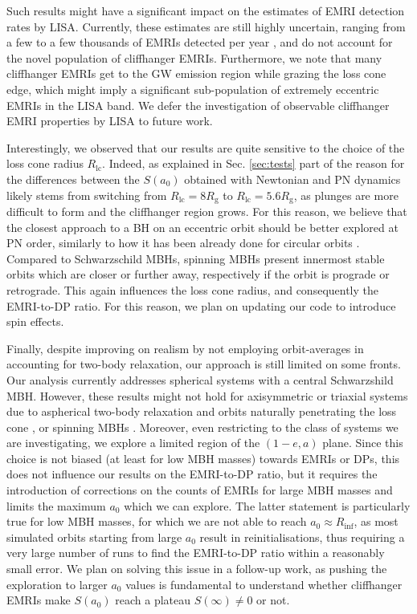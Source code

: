 \documentclass[desactivate]{aa}
\begin{document}
    Such results might have a significant impact on the estimates of EMRI detection rates by LISA. Currently, these estimates are still highly uncertain, ranging from a few to a few thousands of EMRIs detected per year \citep{2017PhRvD..95j3012B}, and do not account for the novel population of cliffhanger EMRIs. Furthermore, we note that many cliffhanger EMRIs get to the GW emission region while grazing the loss cone edge, which might imply a significant sub-population of extremely eccentric EMRIs in the LISA band. We defer the investigation of observable cliffhanger EMRI properties by LISA to future work.

    Interestingly, we observed that our results are quite sensitive to the choice of the loss cone radius $R_\mathrm{lc}$. Indeed, as explained in Sec. \ref{sec:tests} part of the reason for the differences between the $S(a_0)$ obtained with Newtonian and PN dynamics likely stems from switching from $R_\mathrm{lc} = 8 R_\mathrm{g}$ to $R_\mathrm{lc} = 5.6 R_\mathrm{g}$, as plunges are more difficult to form and the cliffhanger region grows. For this reason, we believe that the closest approach to a BH on an eccentric orbit should be better explored at PN order, similarly to how it has been already done for circular orbits \citep[e.g.][]{2024LRR....27....2S}. Compared to Schwarzschild MBHs, spinning MBHs present innermost stable orbits which are closer or further away, respectively if the orbit is prograde or retrograde. This again influences the loss cone radius, and consequently the EMRI-to-DP ratio. For this reason, we plan on updating our code to introduce spin effects.  

    Finally, despite improving on realism by not employing orbit-averages in accounting for two-body relaxation, our approach is still limited on some fronts. Our analysis currently addresses spherical systems with a central Schwarzshild MBH. However, these results might not hold for axisymmetric or triaxial systems due to aspherical two-body relaxation and orbits naturally penetrating the loss cone \citep{2013ApJ...774...87V,2024arXiv240518500K}, or spinning MBHs \citep{2013MNRAS.429.3155A}. Moreover, even restricting to the class of systems we are investigating, we explore a limited region of the $(1-e,a)$ plane. Since this choice is not biased (at least for low MBH masses) towards EMRIs or DPs, this does not influence our results on the EMRI-to-DP ratio, but it requires the introduction of corrections on the counts of EMRIs for large MBH masses and limits the maximum $a_0$ which we can explore. The latter statement is particularly true for low MBH masses, for which we are not able to reach $a_0 \approx R_\mathrm{inf}$, as most simulated orbits starting from large $a_0$ result in reinitialisations, thus requiring a very large number of runs to find the EMRI-to-DP ratio within a reasonably small error. We plan on solving this issue in a follow-up work, as pushing the exploration to larger $a_0$ values is fundamental to understand whether cliffhanger EMRIs make $S(a_0)$ reach a plateau $S(\infty) \neq 0 $ or not.
\end{document}
